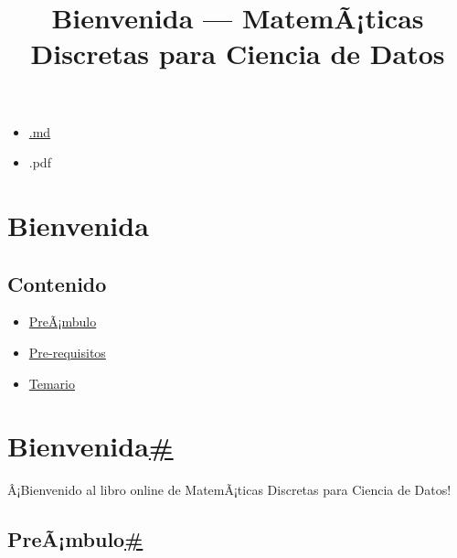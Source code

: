 \documentclass[
]{article}
\title{Bienvenida --- MatemÃ¡ticas Discretas para Ciencia de Datos}
\author{}
\date{}
\providecommand{\tightlist}{%
  \setlength{\itemsep}{0pt}\setlength{\parskip}{0pt}}
\begin{document}
\maketitle

\label{main-content}
{}

\emph{}

\begin{itemize}
\tightlist
\item
  \href{_sources/intro.md}{{ \emph{} } {.md}}
\item
  { \emph{} } {.pdf}
\end{itemize}

{ \emph{} }

{}

\label{jb-print-docs-body}
\section{Bienvenida}\label{bienvenida}

\label{print-main-content}
\label{jb-print-toc}
\subsection{Contenido}\label{contenido}

\begin{itemize}
\tightlist
\item
  \hyperref[preambulo]{PreÃ¡mbulo}
\item
  \hyperref[pre-requisitos]{Pre-requisitos}
\item
  \hyperref[temario]{Temario}
\end{itemize}

\label{searchbox}

\label{bienvenida}
\section{\texorpdfstring{Bienvenida\hyperref[bienvenida]{\#}}{Bienvenida\#}}\label{bienvenida-1}

Â¡Bienvenido al libro online de MatemÃ¡ticas Discretas para Ciencia de
Datos!

\label{preambulo}
\subsection{\texorpdfstring{PreÃ¡mbulo\hyperref[preambulo]{\#}}{PreÃ¡mbulo\#}}\label{preuxe3mbulo}
\end{document}

